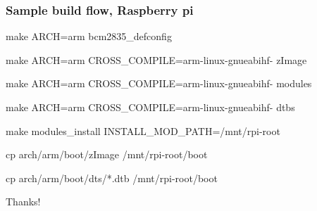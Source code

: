 \documentclass{beamer}
\begin{document}
\begin{frame}[fragile]
\frametitle{Sample build flow, Raspberry pi}
\begin{semiverbatim}
\item make ARCH=arm bcm2835_defconfig
\item make ARCH=arm CROSS_COMPILE=arm-linux-gnueabihf- zImage
\item make ARCH=arm CROSS_COMPILE=arm-linux-gnueabihf- modules
\item make ARCH=arm CROSS_COMPILE=arm-linux-gnueabihf- dtbs
\item make modules_install INSTALL_MOD_PATH=/mnt/rpi-root
\item cp arch/arm/boot/zImage /mnt/rpi-root/boot
\item cp arch/arm/boot/dts/*.dtb /mnt/rpi-root/boot
\end{semiverbatim}
\end{frame}

\begin{frame}
\Huge{\centerline{Thanks!}}
\end{frame}
\end{document}

